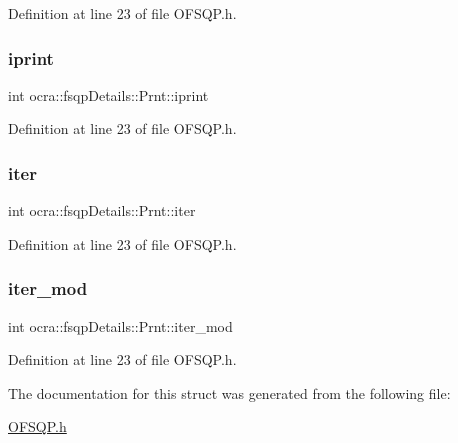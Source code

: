 Definition at line 23 of file O\+F\+S\+Q\+P.\+h.

\hypertarget{structocra_1_1fsqpDetails_1_1Prnt_a6ae9ecd70d6b52123a4d24a8cc47dfa6}{}\label{structocra_1_1fsqpDetails_1_1Prnt_a6ae9ecd70d6b52123a4d24a8cc47dfa6} 
\subsubsection{\texorpdfstring{iprint}{iprint}}
{\footnotesize\ttfamily int ocra\+::fsqp\+Details\+::\+Prnt\+::iprint}



Definition at line 23 of file O\+F\+S\+Q\+P.\+h.

\hypertarget{structocra_1_1fsqpDetails_1_1Prnt_a276fb8038114797a04a94e1b2ec10a35}{}\label{structocra_1_1fsqpDetails_1_1Prnt_a276fb8038114797a04a94e1b2ec10a35} 
\subsubsection{\texorpdfstring{iter}{iter}}
{\footnotesize\ttfamily int ocra\+::fsqp\+Details\+::\+Prnt\+::iter}



Definition at line 23 of file O\+F\+S\+Q\+P.\+h.

\hypertarget{structocra_1_1fsqpDetails_1_1Prnt_ab7a06548e1ccc8483b3221798ab15e7e}{}\label{structocra_1_1fsqpDetails_1_1Prnt_ab7a06548e1ccc8483b3221798ab15e7e} 
\subsubsection{\texorpdfstring{iter\+\_\+mod}{iter\_mod}}
{\footnotesize\ttfamily int ocra\+::fsqp\+Details\+::\+Prnt\+::iter\+\_\+mod}



Definition at line 23 of file O\+F\+S\+Q\+P.\+h.



The documentation for this struct was generated from the following file\+:\begin{DoxyCompactItemize}
\item 
\hyperlink{OFSQP_8h}{O\+F\+S\+Q\+P.\+h}\end{DoxyCompactItemize}
